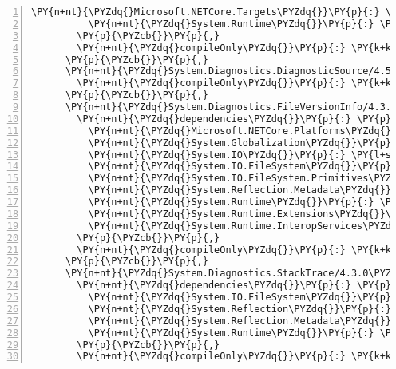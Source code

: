 \begin{Verbatim}[commandchars=\\\{\},numbers=left,firstnumber=1,stepnumber=1,numberblanklines=0]
          \PY{n+nt}{\PYZdq{}Microsoft.NETCore.Targets\PYZdq{}}\PY{p}{:} \PY{l+s+s2}{\PYZdq{}2.1.0\PYZhy{}rc1\PYZdq{}}\PY{p}{,}
          \PY{n+nt}{\PYZdq{}System.Runtime\PYZdq{}}\PY{p}{:} \PY{l+s+s2}{\PYZdq{}4.3.0\PYZdq{}}
        \PY{p}{\PYZcb{}}\PY{p}{,}
        \PY{n+nt}{\PYZdq{}compileOnly\PYZdq{}}\PY{p}{:} \PY{k+kc}{true}
      \PY{p}{\PYZcb{}}\PY{p}{,}
      \PY{n+nt}{\PYZdq{}System.Diagnostics.DiagnosticSource/4.5.0\PYZhy{}rc1\PYZdq{}}\PY{p}{:} \PY{p}{\PYZob{}}
        \PY{n+nt}{\PYZdq{}compileOnly\PYZdq{}}\PY{p}{:} \PY{k+kc}{true}
      \PY{p}{\PYZcb{}}\PY{p}{,}
      \PY{n+nt}{\PYZdq{}System.Diagnostics.FileVersionInfo/4.3.0\PYZdq{}}\PY{p}{:} \PY{p}{\PYZob{}}
        \PY{n+nt}{\PYZdq{}dependencies\PYZdq{}}\PY{p}{:} \PY{p}{\PYZob{}}
          \PY{n+nt}{\PYZdq{}Microsoft.NETCore.Platforms\PYZdq{}}\PY{p}{:} \PY{l+s+s2}{\PYZdq{}2.1.0\PYZhy{}rc1\PYZdq{}}\PY{p}{,}
          \PY{n+nt}{\PYZdq{}System.Globalization\PYZdq{}}\PY{p}{:} \PY{l+s+s2}{\PYZdq{}4.3.0\PYZdq{}}\PY{p}{,}
          \PY{n+nt}{\PYZdq{}System.IO\PYZdq{}}\PY{p}{:} \PY{l+s+s2}{\PYZdq{}4.3.0\PYZdq{}}\PY{p}{,}
          \PY{n+nt}{\PYZdq{}System.IO.FileSystem\PYZdq{}}\PY{p}{:} \PY{l+s+s2}{\PYZdq{}4.3.0\PYZdq{}}\PY{p}{,}
          \PY{n+nt}{\PYZdq{}System.IO.FileSystem.Primitives\PYZdq{}}\PY{p}{:} \PY{l+s+s2}{\PYZdq{}4.3.0\PYZdq{}}\PY{p}{,}
          \PY{n+nt}{\PYZdq{}System.Reflection.Metadata\PYZdq{}}\PY{p}{:} \PY{l+s+s2}{\PYZdq{}1.6.0\PYZhy{}rc1\PYZdq{}}\PY{p}{,}
          \PY{n+nt}{\PYZdq{}System.Runtime\PYZdq{}}\PY{p}{:} \PY{l+s+s2}{\PYZdq{}4.3.0\PYZdq{}}\PY{p}{,}
          \PY{n+nt}{\PYZdq{}System.Runtime.Extensions\PYZdq{}}\PY{p}{:} \PY{l+s+s2}{\PYZdq{}4.3.0\PYZdq{}}\PY{p}{,}
          \PY{n+nt}{\PYZdq{}System.Runtime.InteropServices\PYZdq{}}\PY{p}{:} \PY{l+s+s2}{\PYZdq{}4.3.0\PYZdq{}}
        \PY{p}{\PYZcb{}}\PY{p}{,}
        \PY{n+nt}{\PYZdq{}compileOnly\PYZdq{}}\PY{p}{:} \PY{k+kc}{true}
      \PY{p}{\PYZcb{}}\PY{p}{,}
      \PY{n+nt}{\PYZdq{}System.Diagnostics.StackTrace/4.3.0\PYZdq{}}\PY{p}{:} \PY{p}{\PYZob{}}
        \PY{n+nt}{\PYZdq{}dependencies\PYZdq{}}\PY{p}{:} \PY{p}{\PYZob{}}
          \PY{n+nt}{\PYZdq{}System.IO.FileSystem\PYZdq{}}\PY{p}{:} \PY{l+s+s2}{\PYZdq{}4.3.0\PYZdq{}}\PY{p}{,}
          \PY{n+nt}{\PYZdq{}System.Reflection\PYZdq{}}\PY{p}{:} \PY{l+s+s2}{\PYZdq{}4.3.0\PYZdq{}}\PY{p}{,}
          \PY{n+nt}{\PYZdq{}System.Reflection.Metadata\PYZdq{}}\PY{p}{:} \PY{l+s+s2}{\PYZdq{}1.6.0\PYZhy{}rc1\PYZdq{}}\PY{p}{,}
          \PY{n+nt}{\PYZdq{}System.Runtime\PYZdq{}}\PY{p}{:} \PY{l+s+s2}{\PYZdq{}4.3.0\PYZdq{}}
        \PY{p}{\PYZcb{}}\PY{p}{,}
        \PY{n+nt}{\PYZdq{}compileOnly\PYZdq{}}\PY{p}{:} \PY{k+kc}{true}

\end{Verbatim}
